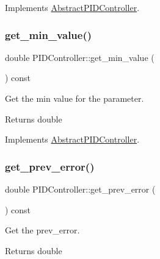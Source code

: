 Implements \hyperlink{classAbstractPIDController}{Abstract\+P\+I\+D\+Controller}.

\mbox{\label{classPIDController_ab29545c6bcce3ef804bdbf0f2441cb4e}} 
\subsubsection{\texorpdfstring{get\+\_\+min\+\_\+value()}{get\_min\_value()}}
{\footnotesize\ttfamily double P\+I\+D\+Controller\+::get\+\_\+min\+\_\+value (\begin{DoxyParamCaption}{ }\end{DoxyParamCaption}) const\hspace{0.3cm}{\ttfamily [virtual]}}



Get the min value for the parameter. 

\begin{DoxyReturn}{Returns}
double 
\end{DoxyReturn}


Implements \hyperlink{classAbstractPIDController}{Abstract\+P\+I\+D\+Controller}.

\mbox{\label{classPIDController_a7617f92c27f92fa53e8c690a721e9965}} 
\subsubsection{\texorpdfstring{get\+\_\+prev\+\_\+error()}{get\_prev\_error()}}
{\footnotesize\ttfamily double P\+I\+D\+Controller\+::get\+\_\+prev\+\_\+error (\begin{DoxyParamCaption}{ }\end{DoxyParamCaption}) const\hspace{0.3cm}{\ttfamily [virtual]}}



Get the prev\+\_\+error. 

\begin{DoxyReturn}{Returns}
double 
\end{DoxyReturn}



